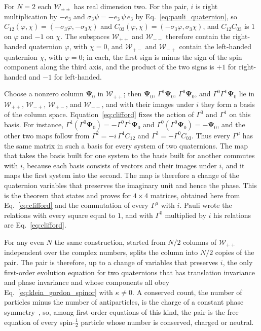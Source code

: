 \documentclass[aps,prd,onecolumn,tightenlines,nofootinbib,notitlepage,11pt,floatfix]{revtex4-2}
\theoremstyle{indentedtheorem}
\begin{document}
For $N=2$ each $\mathcal{W}_{\pm\pm}$ has real dimension two. For the pair, $i$ is right multiplication by $-e_3$ and $\sigma_3\psi=-e_3\,\psi\,e_3$ by Eq.~\eqref{eq:pauli_quaternion}, so $C_{12}(\varphi,\chi)=(-\sigma_3\varphi,-\sigma_3\chi)$ and $C_{03}(\varphi,\chi)=(-\sigma_3\varphi,\sigma_3\chi)$, and $C_{12}C_{03}$ is $1$ on $\varphi$ and $-1$ on $\chi$. The subspaces $\mathcal{W}_{++}$ and $\mathcal{W}_{--}$ therefore contain the right-handed quaternion $\varphi$, with $\chi=0$, and $\mathcal{W}_{+-}$ and $\mathcal{W}_{-+}$ contain the left-handed quaternion $\chi$, with $\varphi=0$; in each, the first sign is minus the sign of the spin component along the third axis, and the product of the two signs is $+1$ for right-handed and $-1$ for left-handed.

Choose a nonzero column $\boldsymbol{\Psi}_0$ in $\mathcal{W}_{++}$; then $\boldsymbol{\Psi}_0$, $\Gamma^1\boldsymbol{\Psi}_0$, $\Gamma^0\boldsymbol{\Psi}_0$, and $\Gamma^0\Gamma^1\boldsymbol{\Psi}_0$ lie in $\mathcal{W}_{++}$, $\mathcal{W}_{-+}$, $\mathcal{W}_{+-}$, and $\mathcal{W}_{--}$, and with their images under $i$ they form a basis of the column space. Equation~\eqref{eq:clifford} fixes the action of $\Gamma^0$ and $\Gamma^1$ on this basis. For instance, $\Gamma^1(\Gamma^0\boldsymbol{\Psi}_0)=-\Gamma^0\Gamma^1\boldsymbol{\Psi}_0$ and $\Gamma^0(\Gamma^0\boldsymbol{\Psi}_0)=-\boldsymbol{\Psi}_0$, and the other two maps follow from $\Gamma^2=-i\,\Gamma^1C_{12}$ and $\Gamma^3=-\Gamma^0C_{03}$. Thus every $\Gamma^\mu$ has the same matrix in such a basis for every system of two quaternions. The map that takes the basis built for one system to the basis built for another commutes with $i$, because each basis consists of vectors and their images under $i$, and it maps the first system into the second. The map is therefore a change of the quaternion variables that preserves the imaginary unit and hence the phase. This is the theorem that \citet{Pauli1936Contributions} states and proves for $4\times4$ matrices, obtained here from Eq.~\eqref{eq:clifford} and the commutation of every $\Gamma^\mu$ with $i$. Pauli wrote the relations with every square equal to $1$, and with $\Gamma^0$ multiplied by $i$ his relations are Eq.~\eqref{eq:clifford}.

For any even $N$ the same construction, started from $N/2$ columns of $\mathcal{W}_{++}$ independent over the complex numbers, splits the column into $N/2$ copies of the pair. The pair is therefore, up to a change of variables that preserves $i$, the only first-order evolution equation for two quaternions that has translation invariance and phase invariance and whose components all obey Eq.~\eqref{eq:klein_gordon_spinor} with $\kappa\neq0$. A conserved count, the number of particles minus the number of antiparticles, is the charge of a constant phase symmetry~\citep{Avignone2008Double}, so, among first-order equations of this kind, the pair is the free equation of every spin-$\tfrac{1}{2}$ particle whose number is conserved, charged or neutral.
\end{document}
